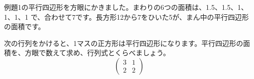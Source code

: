 \begin{minipage}[c]{0.46\linewidth}\raggedright
例題1の平行四辺形を方眼にかきました。まわりの6つの面積は、1.5、1.5、1、1、1、1 で、合わせて7です。長方形12から7をひいた5が、まん中の平行四辺形の面積です。
\end{minipage}
\par\vspace{4pt}

\begin{jibun}
次の行列をかけると、1マスの正方形は平行四辺形になります。平行四辺形の面積を、方眼で数えて求め、行列式とくらべましょう。
\[ \begin{pmatrix}3&1\\2&2\end{pmatrix} \]
\end{jibun}

